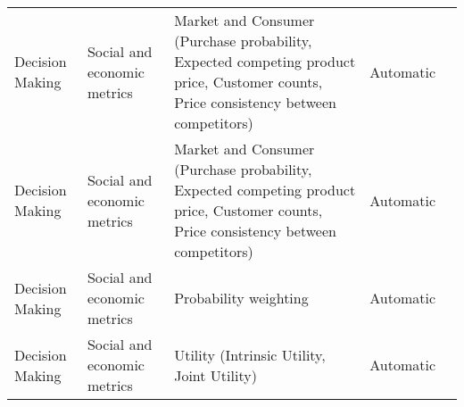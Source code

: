 \begin{small}
\begin{center}
\begin{longtable}{@{}p{}p{}p{}p{}p{}@{}}
Decision Making          & Social and economic metrics         & Market and Consumer (Purchase probability, Expected competing product price, Customer counts, Price consistency between competitors)                                                                        & Automatic & \cite{Gui2023TheCO}                                                                                                                                                                                                                                                                                                                                                                                                      \\
Decision Making          & Social and economic metrics         & Market and Consumer (Purchase probability, Expected competing product price, Customer counts, Price consistency between competitors)                                                                        & Automatic & \cite{Zhao2023CompeteAIUT}                                                                                                                                                                                                                                                                                                                                                                                                      \\
Decision Making          & Social and economic metrics         & Probability weighting                                                                                                                                                                                       & Automatic & \cite{Jia2024DecisionMakingBE}                                                                                                                                                                                                                                                                                                                                                                                                      \\
Decision Making          & Social and economic metrics         & Utility (Intrinsic Utility, Joint Utility)                                                                                                                                                                  & Automatic & \cite{huang2024personality}                                                                                                                                                                                                                                                                                                                                                                                                 \\

\end{longtable}
\end{center}
\end{small}
